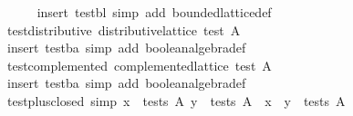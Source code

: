 \begin{isabellebody}
%
\isadelimproof
\ \ \ \ %
\endisadelimproof
%
\isatagproof
{}\isamarkupfalse%
\ {}insert\ test{}bl{}\ simp\ add{}\ bounded{}lattice{}def{}%
\endisatagproof
{\isafoldproof}%
%
\isadelimproof
\isanewline
%
\endisadelimproof
\isanewline
\ \ \isamarkupfalse%
\ test{}distributive{}\ {}distributive{}lattice\ {}test\ A{}{}\isanewline
%
\isadelimproof
\ \ \ \ %
\endisadelimproof
%
\isatagproof
{}\isamarkupfalse%
\ {}insert\ test{}ba{}\ simp\ add{}\ boolean{}algebra{}def{}%
\endisatagproof
{\isafoldproof}%
%
\isadelimproof
\isanewline
%
\endisadelimproof
\isanewline
\ \ \isamarkupfalse%
\ test{}complemented{}\ {}complemented{}lattice\ {}test\ A{}{}\isanewline
%
\isadelimproof
\ \ \ \ %
\endisadelimproof
%
\isatagproof
{}\isamarkupfalse%
\ {}insert\ test{}ba{}\ simp\ add{}\ boolean{}algebra{}def{}%
\endisatagproof
{\isafoldproof}%
%
\isadelimproof
\isanewline
%
\endisadelimproof
\isanewline
\ \ \isamarkupfalse%
\ test{}plus{}closed\ {}simp{}{}\ {}{}x\ {}\ tests\ A{}\ y\ {}\ tests\ A{}\ {}\ x\ {}\ y\ {}\ tests\ A{}\isanewline

\end{isabellebody}
